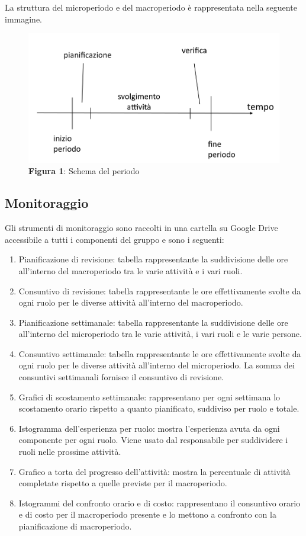 La struttura del microperiodo e del macroperiodo è rappresentata nella seguente immagine.
\begin{figure}[H]
	\centering
	\includegraphics[width=0.7\linewidth]{res/images/schema_periodo.png}
	\caption*{\textbf{Figura 1}: Schema del periodo}
	\label{fig:linea_tempo_periodo}
\end{figure}

\subsection{Monitoraggio}
Gli strumenti di monitoraggio sono raccolti in una cartella su Google Drive accessibile a tutti i componenti del gruppo e sono i seguenti:
\begin{enumerate}
	\item Pianificazione di revisione: tabella rappresentante la suddivisione delle ore all'interno del macroperiodo tra le varie attività e i vari ruoli.
	\item Consuntivo di revisione: tabella rappresentante le ore effettivamente svolte da ogni ruolo per le diverse attività all'interno del macroperiodo.
	\item Pianificazione settimanale: tabella rappresentante la suddivisione delle ore all'interno del microperiodo tra le varie attività, i vari ruoli e le varie persone.
	\item Consuntivo settimanale: tabella rappresentante le ore effettivamente svolte da ogni ruolo per le diverse attività all'interno del microperiodo. La somma dei consuntivi settimanali fornisce il consuntivo di revisione.
	\item Grafici di scostamento settimanale: rappresentano per ogni settimana lo scostamento orario rispetto a quanto pianificato, suddiviso per ruolo e totale.
	\item Istogramma dell'esperienza per ruolo: mostra l'esperienza avuta da ogni componente per ogni ruolo. Viene usato dal responsabile per suddividere i ruoli nelle prossime attività.
	\item Grafico a torta del progresso dell'attività: mostra la percentuale di attività completate rispetto a quelle previste per il macroperiodo.
	\item Istogrammi del confronto orario e di costo: rappresentano il consuntivo orario e di costo per il macroperiodo presente e lo mettono a confronto con la pianificazione di macroperiodo.
\end{enumerate}

